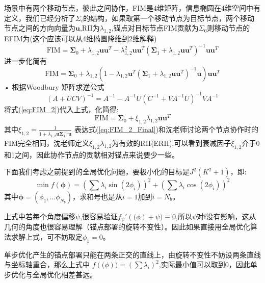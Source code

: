 \documentclass[12pt]{article}
\theoremstyle{remark}
\begin{document}
场景中有两个移动节点，彼此之间协作，FIM是4维矩阵，信息椭圆在4维空间中有定义，我们已经分析了$\Sigma_i$的结构，如果取第一个移动节点为目标节点，两个移动节点之间的方向向量为$\bm{u}$,RII为$\lambda_{1,2}$,锚点对目标节点FIM贡献为$\Sigma_0$则移动节点的EFIM为(这个应该可以从4维椭圆降维到2维解释)
\begin{equation}
\text{FIM}=\bm{\Sigma}_0+\lambda_{1,2}\bm{u}\bm{u}^T-\lambda_{1,2}^2\bm{u}\bm{u}^T(\bm{\Sigma}_1+\lambda_{1,2}\bm{u}\bm{u}^T)^{-1}\bm{u}\bm{u}^T
\end{equation}
进一步化简有
\begin{equation}\label{eq:FIM_2}
\text{FIM}=\bm{\Sigma}_0+\lambda_{1,2}(1-\lambda_{1,2}\bm{u}^T(\bm{\Sigma}_1+\lambda_{1,2}\bm{u}\bm{u}^T)^{-1}\bm{u})\bm{u}\bm{u}^T\end{equation}•
根据Woodbury 矩阵求逆公式
\begin{equation}
(A+UCV)^{-1}=A^{-1}-A^{-1}U(C^{-1}+VA^{-1}U)^{-1}VA^{-1}
\end{equation}
将式(\ref{eq:FIM_2})代入上式，化简得:
\begin{equation}\label{eq:FIM_2_Final}
\text{FIM}=\bm{\Sigma}_0+\xi_{1,2}\lambda_{1,2}\bm{u}\bm{u}^T
\end{equation}
其中$\xi_{1,2}=\frac{1}{1+\lambda_{1,2}\bm{u}\bm{\Sigma}_1^{-1}\bm{u}}$
表达式(\ref{eq:FIM_2_Final})和沈老师讨论两个节点协作时的FIM完全相同，沈老师定义$\xi_{1,2}\lambda_{1,2}$为有效的RII(ERII),可以看到衰减因子$\xi_{1,2}$介于0和1之间，因此协作节点的贡献相对锚点来说要少一些。

下面我们考虑之前提到的全局优化问题，要极小化的目标是$J^2(K^2+1)$，即:
\begin{equation}
\min f(\bm{\phi})=(\sum \lambda_i \sin(2\phi_i))^2
+(\sum \lambda_i \cos(2\phi_i))^2
\end{equation}
其中$\bm{\phi}=(\phi_1,...\phi_{N_b})$，求和号也是从$i=1$加到$i=N_b$。

上式中若每个角度偏移$\psi$,很容易验证$f_{\psi}'(\bm(\phi)+\psi)\equiv 0$,所以$\psi$对f没有影响，这从几何的角度也很容易理解（锚点部署的旋转不变性）。因此如果直接用全局优化算法求解上式，可不妨取定$\phi_1=0$。

单步优化产生的锚点部署只能在两条正交的直线上，由旋转不变性不妨设两条直线与坐标轴重合，那么上式中
$f(\bm(\phi))=(\sum \lambda_i)^2$,实际最小值可以取到0，因此单步优化与全局优化相差甚远。
\end{document}
